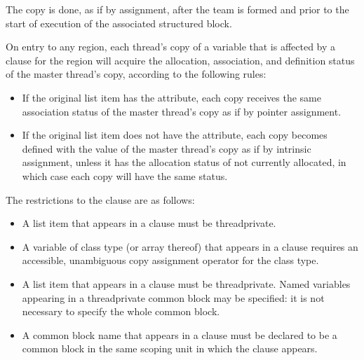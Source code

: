 {{{{\fortranspecificstart
The copy is done, as if by assignment, after the team is formed and prior to the start of 
execution of the associated structured block.

On entry to any  region, each thread’s copy of a variable that is affected by 
a  clause for the  region will acquire the allocation, association, and 
definition status of the master thread’s copy, according to the following rules:

\begin{itemize}
\item If the original list item has the  attribute, each copy receives the same 
association status of the master thread’s copy as if by pointer assignment.

\item If the original list item does not have the  attribute, each copy becomes 
defined with the value of the master thread's copy as if by intrinsic assignment, 
unless it has the allocation status of not currently allocated, in which case each copy 
will have the same status.
\end{itemize}
\fortranspecificend

\restrictions
The restrictions to the  clause are as follows:
\ccppspecificstart
\begin{itemize}
\item A list item that appears in a  clause must be threadprivate.

\item A variable of class type (or array thereof) that appears in a  clause requires 
an accessible, unambiguous copy assignment operator for the class type.
\end{itemize}
\ccppspecificend

\fortranspecificstart
\begin{itemize}
\item A list item that appears in a  clause must be threadprivate. Named variables 
appearing in a threadprivate common block may be specified: it is not necessary to 
specify the whole common block. 

\item A common block name that appears in a  clause must be declared to be a 
common block in the same scoping unit in which the  clause appears.
\end{itemize}
\fortranspecificend









}}}}
